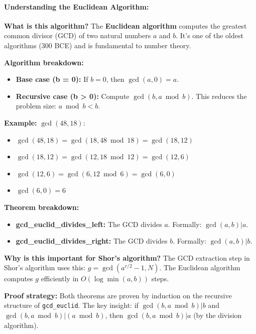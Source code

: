 \paragraph{Understanding the Euclidean Algorithm:}

\textbf{What is this algorithm?} The \textbf{Euclidean algorithm} computes the greatest common divisor (GCD) of two natural numbers $a$ and $b$. It's one of the oldest algorithms (300 BCE) and is fundamental to number theory.

\textbf{Algorithm breakdown:}
\begin{itemize}
    \item \textbf{Base case (b = 0):} If $b = 0$, then $\gcd(a, 0) = a$.
    
    \item \textbf{Recursive case (b > 0):} Compute $\gcd(b, a \bmod b)$. This reduces the problem size: $a \bmod b < b$.
\end{itemize}

\textbf{Example:} $\gcd(48, 18)$:
\begin{itemize}
    \item $\gcd(48, 18) = \gcd(18, 48 \bmod 18) = \gcd(18, 12)$
    \item $\gcd(18, 12) = \gcd(12, 18 \bmod 12) = \gcd(12, 6)$
    \item $\gcd(12, 6) = \gcd(6, 12 \bmod 6) = \gcd(6, 0)$
    \item $\gcd(6, 0) = 6$
\end{itemize}

\textbf{Theorem breakdown:}
\begin{itemize}
    \item \textbf{gcd\_euclid\_divides\_left:} The GCD divides $a$. Formally: $\gcd(a, b) | a$.
    
    \item \textbf{gcd\_euclid\_divides\_right:} The GCD divides $b$. Formally: $\gcd(a, b) | b$.
\end{itemize}

\textbf{Why is this important for Shor's algorithm?} The GCD extraction step in Shor's algorithm uses this: $g = \gcd(a^{r/2} - 1, N)$. The Euclidean algorithm computes $g$ efficiently in $O(\log \min(a, b))$ steps.

\textbf{Proof strategy:} Both theorems are proven by induction on the recursive structure of \texttt{gcd\_euclid}. The key insight: if $\gcd(b, a \bmod b) | b$ and $\gcd(b, a \bmod b) | (a \bmod b)$, then $\gcd(b, a \bmod b) | a$ (by the division algorithm).



